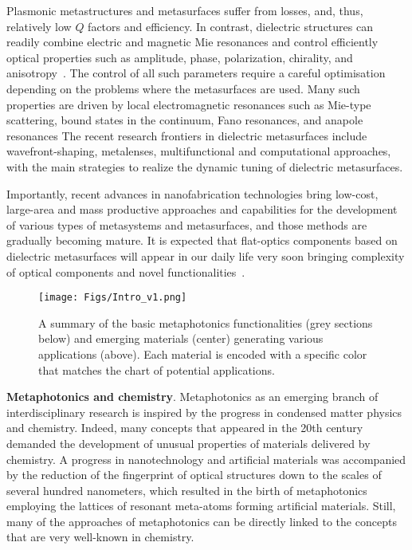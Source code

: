 \documentclass[journal=chreay,manuscript=review]{achemso}
\begin{document}
Plasmonic metastructures and metasurfaces suffer from losses, and, thus, relatively low $Q$ factors and efficiency. In contrast, dielectric structures can readily combine electric and magnetic Mie resonances and control efficiently optical properties such as amplitude, phase, polarization, chirality, and anisotropy~\cite{cwqiu_2021}. The control of all such parameters require a careful optimisation depending on the problems where the metasurfaces are used. Many such properties are driven by local electromagnetic resonances such as Mie-type scattering, bound states in the continuum, Fano resonances, and anapole resonances The recent research frontiers in dielectric metasurfaces include wavefront-shaping, metalenses, multifunctional and computational approaches, with the main strategies to realize the dynamic tuning of dielectric metasurfaces.

Importantly, recent advances in nanofabrication technologies bring low-cost, large-area and mass productive approaches and capabilities for the development of various types of metasystems and metasurfaces, and those methods are gradually becoming mature.\cite{yoon2020single,jung2021three} It is expected that flat-optics components based on dielectric metasurfaces will appear in our daily life very soon bringing complexity of optical components and novel functionalities~\cite{capasso}. 

\begin{figure}[t!]
    \centering
    \texttt{[image: Figs/Intro\_v1.png]}
    \caption{A summary of the basic metaphotonics functionalities (grey sections below) and emerging materials (center) generating various applications (above). Each material is encoded with a specific color that matches the chart of potential applications.}
    \label{fig:Intro}
\end{figure}

{\bf Metaphotonics and chemistry}. Metaphotonics as an emerging branch of interdisciplinary research is inspired by the progress in condensed matter physics and chemistry. Indeed, many concepts that appeared in the 20th century demanded the development of unusual properties of materials delivered by chemistry. A progress in nanotechnology and artificial materials was accompanied by the reduction of the fingerprint of optical structures down to the scales of several hundred nanometers, which resulted in the birth of metaphotonics employing the lattices of resonant meta-atoms forming artificial materials. Still, many of the approaches of metaphotonics can be directly linked to the concepts that are very well-known in chemistry.
\end{document}
